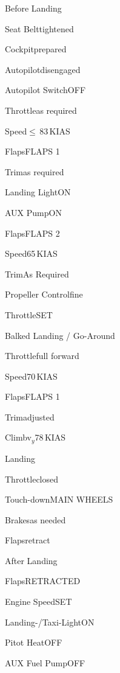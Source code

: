 \begin{checklist}{Before Landing}
  \item{Seat Belt}{tightened}
  \item{Cockpit}{prepared}
  \item{Autopilot}{disengaged}
  \item{Autopilot Switch}{OFF}
  \item{Throttle}{as required}
  \item{Speed}{${\leq}$\,83\,KIAS}
  \item{Flaps}{FLAPS 1}
  \item{Trim}{as required}
  \item{Landing Light}{ON}
  \item{AUX Pump}{ON}
  \item{Flaps}{FLAPS 2}
  \item{Speed}{65\,KIAS}
  \item{Trim}{As Required}
  \item{Propeller Control}{fine}
  \item{Throttle}{SET}
\end{checklist}

\begin{checklist}{Balked Landing / Go-Around}
  \item{Throttle}{full forward}
  \item{Speed}{70\,KIAS}
  \item{Flaps}{FLAPS 1}
  \item{Trim}{adjusted}
  \item{Climb}{v$_{y}$78\,KIAS} 
\end{checklist}

\begin{checklist}{Landing}
  \item{Throttle}{closed}
  \item{Touch-down}{MAIN WHEELS}
  \item{Brakes}{as needed}
  \item{Flaps}{retract}
\end{checklist}

\begin{checklist}{After Landing}
  \item{Flaps}{RETRACTED}
  \item{Engine Speed}{SET}
  \item{Landing-/Taxi-Light}{ON}
  \item{Pitot Heat}{OFF}
  \item{AUX Fuel Pump}{OFF}
\end{checklist}

